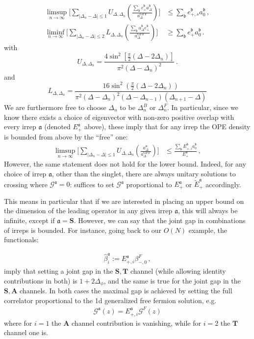 \documentclass[12pt]{article}
\numberwithin{equation}{section}
\newcommand{\be}{\begin{equation}}
\newcommand{\ee}{\end{equation}}
\newcommand{\bea}{\begin{eqnarray}}
\newcommand{\eea}{\end{eqnarray}}
\newcommand{\ba}{\begin{equation}\begin{aligned}}
\newcommand{\ea}{\end{aligned}\end{equation}}
\newcommand{\mbf}{\mathbf}
\newcommand{\Df}{{\Delta_\phi}}
\def\D{\Delta}
\newcommand{\mf}[1]{\mathfrak #1}
\begin{document}
	\begin{align}
	\limsup\limits_{n\to \infty}\Bigg[\sum_{|\Delta_n-\D|\le 1}U_{\D,\D_n}\left(\frac{{\sum_{\mf b} e^{\mf b}_{+} a_{\D}^\mf b}}{a_{\D}^{\text{GFF}}}\right)\Bigg]&\le \sum_{\mf b}e^{\mf b}_{+,s} a_0^{\mf b}\,,\label{Uboundgen}\\
	\liminf\limits_{n\to \infty}\Bigg[\sum_{|\Delta_n-\D|\le 2}L_{\D,\D_n}\left(\frac{\sum_{\mf b} a_{\D}^{\mf b}e_{+}^{\mf b}}{a_{\D}^{\text{GFF}}}\right) \Bigg]&\ge \sum_{\mf b}e^{\mf b}_{+} a_0^{\mf b}\label{Lboundgen}\,.
	\end{align}
	with
	\be
	U_{\D,\D_n}=\frac{4 \sin^2\left[\frac{\pi }{2}(\D-2\D_n)\right]}{\pi ^2 (\Delta -\text{$\Delta_n$})^2}\,.
	\ee
	and 
	\be
	L_{\D,\D_n}=\frac{16 \sin^2\left(\frac{\pi }{2}(\D-2\D_n)\right) }{\pi ^2 (\Delta -\text{$\Delta_n$})^2(\D-\D_{n-1})(\D_{n+1}-\D)}
	\ee
	We are furthermore free to choose $\Delta_n$ to be $\Delta_n^B$ or $\Delta_n^F$. In particular, since we know there exists a choice of eigenvector with non-zero positive overlap with every irrep $\mf a$ (denoted $E_+^{\mf a}$ above), these imply that for any irrep the OPE density is bounded from above by the ``free'' one:
	\ba
	\limsup\limits_{n\to \infty}\Bigg[\sum_{|\Delta_n-\D|\le 1}U_{\D,\D_n}\left(\frac{{a_{\D}^\mf a}}{a_{\D}^{\text{GFF}}}\right)\Bigg]&\le \frac{\sum_{\mf b}E^{\mf b}_{+,i} a_0^{\mf b}}{E_{+}^{\mf a}}\,,\label{Uboundgen}
	\ea
	However, the same statement does not hold for the lower bound. Indeed, for any choice of irrep $\mf a$, other than the singlet, there are always unitary solutions to crossing where $\mathcal G^{\mf a}=0$: suffices to set $\mathcal G^{\mf a}$ proportional to $E^{\mf a}_{+}$ or $\tilde E^{\mf a}_{+}$ accordingly. 
	
	This means in particular that if we are interested in placing an upper bound on the dimension of the leading operator in any given irrep $\mf a$, this will always be infinite, except if $\mf a=\mbf S$. However, we can say that the joint gap in combinations of irreps is bounded. For instance, going back to our $O(N)$ example, the functionals:
	
	\ba
	\widehat \beta_{i}^{\mf a}:=E^{\mf a}_{+,i}\beta_{-,0}^F\,,
	\ea
	imply that setting a joint gap in the $\mbf S,\mbf T$ channel (while allowing identity contributions in both) is $1+2\Df$, and the same is true for the joint gap in the $\mbf S,\mbf A$ channels. In both cases the maximal gap is achieved by setting the full correlator proportional to the 1d generalized free fermion solution, e.g.
	\bea
	\mathcal G^{\mf a}(z)=E_{+,i}^{\mf a} \mathcal G^F(z)
	\eea
	where for $i=1$ the $\mbf A$ channel contribution is vanishing, while for $i=2$ the $\mbf T$ channel one is.
	
\end{document}
